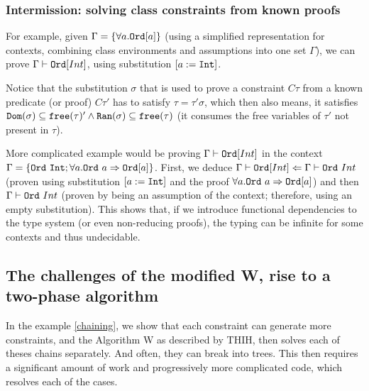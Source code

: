 \subsubsection*{Intermission: solving class constraints from known proofs}

\begin{ex}
    For example, given $\Gamma = \{\forall a . \mathtt{Ord} [a]\}$ (using a simplified representation for contexts, combining class environments and assumptions into one set $\Gamma$), we can prove $\Gamma \vdash \mathtt{Ord} [Int]$, using substitution $[a := \mathtt{Int}]$.
\end{ex}

\begin{observe}
    Notice that the substitution $\sigma$ that is used to prove a constraint $C \tau$ from a known predicate (or proof) $C \tau'$ has to satisfy $\tau = \tau' \sigma$, which then also means, it satisfies $\mathtt{Dom} (\sigma) \subseteq \mathtt{free} (\tau)' \land \mathtt{Ran} (\sigma) \subseteq \mathtt{free} (\tau)$ (it consumes the free variables of $\tau'$ not present in $\tau$).
\end{observe}

\begin{ex}
    \label{chaining}
    More complicated example would be proving $\Gamma \vdash \mathtt{Ord} [Int]$ in the context $\Gamma = \{\mathtt{Ord}\ \mathtt{Int}; \forall a . \mathtt{Ord}\ a \Rightarrow \mathtt{Ord} [a]\}$. First, we deduce $\Gamma \vdash \mathtt{Ord} [Int] \Leftarrow \Gamma \vdash \mathtt{Ord}\ Int$ (proven using substitution $[a := \mathtt{Int}]$ and the proof $\forall a . \mathtt{Ord}\ a \Rightarrow \mathtt{Ord} [a]$) and then $\Gamma \vdash \mathtt{Ord}\ Int$ (proven by being an assumption of the context; therefore, using an empty substitution). This shows that, if we introduce functional dependencies to the type system (or even non-reducing proofs), the typing can be infinite for some contexts and thus undecidable.
\end{ex}

\subsection{The challenges of the modified W, rise to a two-phase algorithm}

In the example \ref{chaining}, we show that each constraint can generate more constraints, and the Algorithm W as described by THIH, then solves each of theses chains separately. And often, they can break into trees. This then requires a significant amount of work and progressively more complicated code, which resolves each of the cases.

